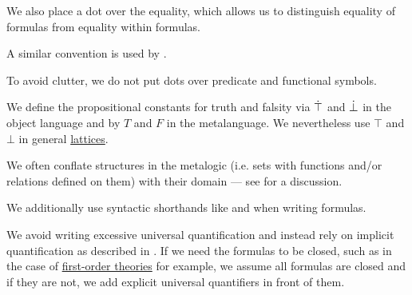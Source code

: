 \begin{remark}
\begin{thmenum}
    We also place a dot over the equality, which allows us to distinguish equality of formulas from equality within formulas.

    A similar convention is used by .

    To avoid clutter, we do not put dots over predicate and functional symbols.

     We define the propositional constants for truth and falsity via \( \dot\top \) and \( \dot\bot \) in the object language and by \( T \) and \( F \) in the metalanguage. We nevertheless use \( \top \) and \( \bot \) in general \hyperref[def:lattice]{lattices}.

     We often conflate structures in the metalogic (i.e. sets with functions and/or relations defined on them) with their domain --- see  for a discussion.

     We additionally use syntactic shorthands like  and  when writing formulas.

     We avoid writing excessive universal quantification and instead rely on implicit quantification as described in . If we need the formulas to be closed, such as in the case of \hyperref[def:first_order_theory]{first-order theories} for example, we assume all formulas are closed and if they are not, we add explicit universal quantifiers in front of them.
  \end{thmenum}
\end{remark}


